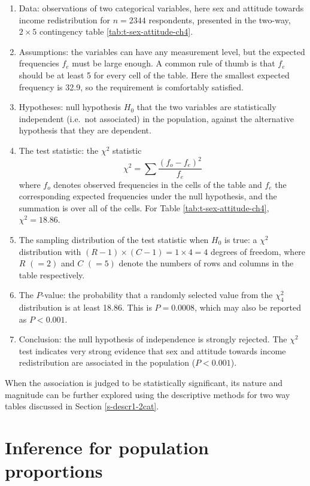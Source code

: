 \documentclass[11pt,a4paper,openany]{book}
\begin{document}
\begin{enumerate}
\def\labelenumi{\arabic{enumi}.}
\item
  Data: observations of two categorical variables, here sex and attitude
  towards income redistribution for \(n=2344\) respondents, presented in
  the two-way, \(2\times 5\) contingency table
  \ref{tab:t-sex-attitude-ch4}.
\item
  Assumptions: the variables can have any measurement level, but the
  expected frequencies \(f_{e}\) must be large enough. A common rule of
  thumb is that \(f_{e}\) should be at least 5 for every cell of the
  table. Here the smallest expected frequency is 32.9, so the
  requirement is comfortably satisfied.
\item
  Hypotheses: null hypothesis \(H_{0}\) that the two variables are
  statistically independent (i.e.~not associated) in the population,
  against the alternative hypothesis that they are dependent.
\item
  The test statistic: the \(\chi^{2}\) statistic \[\chi^{2} = \sum
  \frac{(f_{o}-f_{e})^{2}}{f_{e}}\] where \(f_{o}\) denotes observed
  frequencies in the cells of the table and \(f_{e}\) the corresponding
  expected frequencies under the null hypothesis, and the summation is
  over all of the cells. For Table \ref{tab:t-sex-attitude-ch4},
  \(\chi^{2}=18.86\).
\item
  The sampling distribution of the test statistic when \(H_{0}\) is
  true: a \(\chi^{2}\) distribution with
  \((R-1)\times(C-1)=1\times 4=4\) degrees of freedom, where \(R\)
  \((=2)\) and \(C\) \((=5)\) denote the numbers of rows and columns in
  the table respectively.
\item
  The \(P\)-value: the probability that a randomly selected value from
  the \(\chi^{2}_{4}\) distribution is at least 18.86. This is
  \(P=0.0008\), which may also be reported as \(P<0.001\).
\item
  Conclusion: the null hypothesis of independence is strongly rejected.
  The \(\chi^{2}\) test indicates very strong evidence that sex and
  attitude towards income redistribution are associated in the
  population (\(P<0.001\)).
\end{enumerate}

When the association is judged to be statistically significant, its
nature and magnitude can be further explored using the descriptive
methods for two way tables discussed in Section \ref{s-descr1-2cat}.

\chapter{Inference for population proportions}\label{c-probs}
\end{document}
